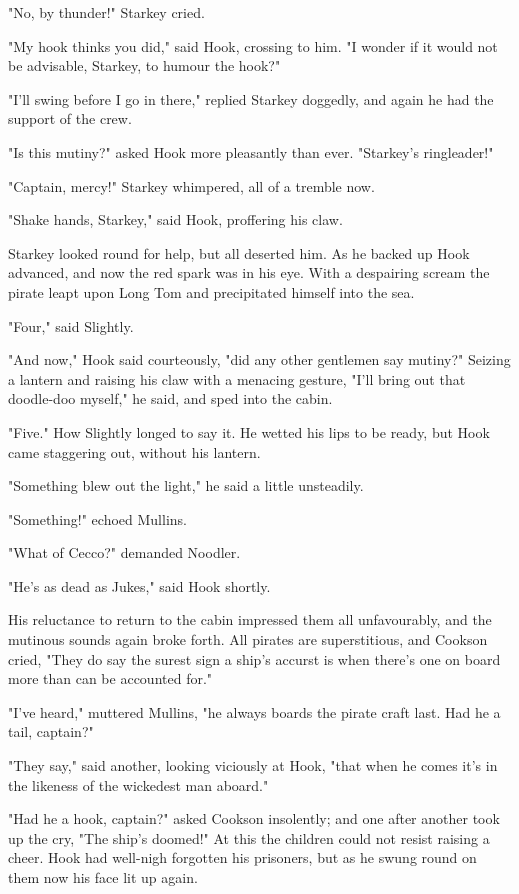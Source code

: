 "No, by thunder!\@" Starkey cried.

"My hook thinks you did," said Hook, crossing to him.
"I wonder if it would not be advisable, Starkey, to humour the hook?"

"I'll swing before I go in there," replied Starkey doggedly, and again he had the support of the crew.

"Is this mutiny?\@" asked Hook more pleasantly than ever.
"Starkey's ringleader!"

"Captain, mercy!\@" Starkey whimpered, all of a tremble now.

"Shake hands, Starkey," said Hook, proffering his claw.

Starkey looked round for help, but all deserted him.
As he backed up Hook advanced, and now the red spark was in his eye.
With a despairing scream the pirate leapt upon Long Tom and precipitated himself into the sea.

"Four," said Slightly.

"And now," Hook said courteously, "did any other gentlemen say mutiny?"
Seizing a lantern and raising his claw with a menacing gesture, "I'll bring out that doodle-doo myself," he said, and sped into the cabin.

"Five."
How Slightly longed to say it.
He wetted his lips to be ready, but Hook came staggering out, without his lantern.

"Something blew out the light," he said a little unsteadily.

"Something!\@" echoed Mullins.

"What of Cecco?\@" demanded Noodler.

"He's as dead as Jukes," said Hook shortly.

His reluctance to return to the cabin impressed them all unfavourably, and the mutinous sounds again broke forth.
All pirates are superstitious, and Cookson cried, "They do say the surest sign a ship's accurst is when there's one on board more than can be accounted for."

"I've heard," muttered Mullins, "he always boards the pirate craft last.
Had he a tail, captain?"

"They say," said another, looking viciously at Hook, "that when he comes it's in the likeness of the wickedest man aboard."

"Had he a hook, captain?\@" asked Cookson insolently;
and one after another took up the cry, "The ship's doomed!"
At this the children could not resist raising a cheer.
Hook had well-nigh forgotten his prisoners, but as he swung round on them now his face lit up again.

